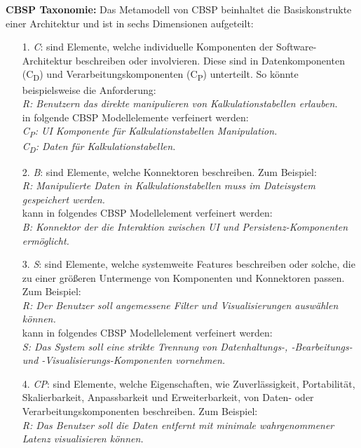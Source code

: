 \textbf{CBSP Taxonomie:}
Das Metamodell von CBSP beinhaltet die Basiskonstrukte einer Architektur und ist in sechs Dimensionen aufgeteilt: \\

\begin{itemize}
\item[1.] \textit{C}: sind Elemente, welche individuelle Komponenten der Software-Architektur beschreiben oder involvieren. Diese sind in Datenkomponenten (C\textsubscript{D}) und Verarbeitungskomponenten (C\textsubscript{P}) unterteilt. So könnte beispielsweise die Anforderung: \\
	\textit{R: Benutzern das direkte manipulieren von Kalkulationstabellen erlauben.} \\
	in folgende CBSP Modellelemente verfeinert werden: \\
	\textit{C\textsubscript{P}: UI Komponente für Kalkulationstabellen Manipulation.} \\
	\textit{C\textsubscript{D}: Daten für Kalkulationstabellen.}  \cite{Gru01}
\item[2.] \textit{B}: sind Elemente, welche Konnektoren beschreiben. Zum Beispiel: \\
	\textit{R: Manipulierte Daten in Kalkulationstabellen muss im Dateisystem gespeichert werden.} \\
	kann in folgendes CBSP Modellelement verfeinert werden: \\
	\textit{B: Konnektor der die Interaktion zwischen UI und Persistenz-Komponenten ermöglicht.} \cite{Gru01}
\item[3.] \textit{S}: sind Elemente, welche systemweite Features beschreiben oder solche, die zu einer größeren Untermenge von Komponenten und Konnektoren passen. Zum Beispiel: \\
	\textit{R: Der Benutzer soll angemessene Filter und Visualisierungen auswählen können.} \\
	kann in folgendes CBSP Modellelement verfeinert werden: \\
	\textit{S: Das System soll eine strikte Trennung von Datenhaltungs-, -Bearbeitungs- und -Visualisierungs-Komponenten vornehmen.} \cite{Gru01}
\item[4.] \textit{CP}: sind Elemente, welche Eigenschaften, wie Zuverlässigkeit, Portabilität, Skalierbarkeit, Anpassbarkeit und Erweiterbarkeit, von Daten- oder Verarbeitungskomponenten beschreiben. Zum Beispiel: \\
	\textit{R: Das Benutzer soll die Daten entfernt mit minimale wahrgenommener Latenz visualisieren können.} \\

\end{itemize}

